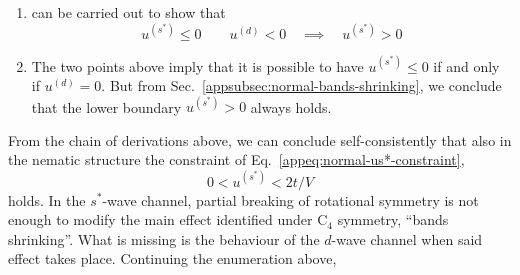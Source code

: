 \begin{enumerate}
	From Eq.~\eqref{appeq:BZ-B-def}, $\forall \mathbf{k} \in \mathcal{B}$ the form factor $\cos k_x + \cos k_y$ is positive by construction; the form factor $\cos k_x - \cos k_y$ is negative by construction. By hypothesis $\epsilon^{(s^*)} < 0$ and $\epsilon^{(d)} > 0$. Hence:
	\[
	\forall \mathbf{k} \in \mathcal{B}
	\quad\colon\quad
	\begin{aligned}
		\tilde{\epsilon}_\mathbf{k} &= \overbrace{\epsilon^{(s^*)} \left( \cos k_x + \cos k_y \right)}^{\le 0} + \overbrace{\epsilon^{(d)}  \left( \cos k_x - \cos k_y \right) }^{\le 0} \\
		\tilde{\epsilon}_{\mathcal{R}\mathbf{k}} &= \underbrace{\epsilon^{(s^*)} \left( \cos k_x + \cos k_y \right)}_{\le 0} - \underbrace{\epsilon^{(d)}  \left( \cos k_x - \cos k_y \right) }_{\le 0}
	\end{aligned}
	\]
	Summing the two equations above we have:
	\[
	\forall \mathbf{k} \in \mathcal{B}
	\quad\colon\quad
	\tilde{\epsilon}_\mathbf{k} + \tilde{\epsilon}_{\mathcal{R}\mathbf{k}} \le 0
	\]
	thus $\tilde{\epsilon}_\mathbf{k} \le -\tilde{\epsilon}_{\mathcal{R}\mathbf{k}}$.	The Fermi-Dirac distribution is monotonically descendent. Then:
	\[
	\forall \mathbf{k} \in \mathcal{B}
	\quad\colon\quad
	\begin{aligned}
		f(\tilde{\epsilon}_\mathbf{k};\beta,\tilde{\mu}) &\ge f(-\tilde{\epsilon}_{\mathcal{R}\mathbf{k}};\beta,\tilde{\mu}) \\
		f(-\tilde{\epsilon}_\mathbf{k};\beta,\tilde{\mu}) &\le f(\tilde{\epsilon}_{\mathcal{R}\mathbf{k}};\beta,\tilde{\mu}) 
	\end{aligned}
	\]
	This condition, inserted in Eq.~\eqref{appeq:normal-us*-AR}, leads to an absurd:
	\[
	u^{(s^*)} \le 0 \qquad
	u^{(d)} > 0
	\quad\implies\quad
	u^{(s^*)} > 0
	\]
	\item can be carried out to show that
	\[
	u^{(s^*)} \le 0
	\qquad
	u^{(d)} < 0
	\quad\implies\quad
	u^{(s^*)} > 0
	\]
	\item The two points above imply that it is possible to have $u^{(s^*)} \le 0$ if and only if $u^{(d)}=0$. But from Sec.~\ref{appsubsec:normal-bands-shrinking}, we conclude that the lower boundary $u^{(s^*)} > 0$ always holds.
	\setcounter{enumTemp}{\theenumi}
\end{enumerate}
From the chain of derivations above, we can conclude self-consistently that also in the nematic structure the constraint of Eq.~\eqref{appeq:normal-us*-constraint},
\[
0 < u^{(s^*)} < 2t/V
\]
holds. In the $s^*$-wave channel, partial breaking of rotational symmetry is not enough to modify the main effect identified under $\mathrm{C}_4$ symmetry, ``bands shrinking''. What is missing is the behaviour of the $d$-wave channel when said effect takes place. Continuing the enumeration above,

